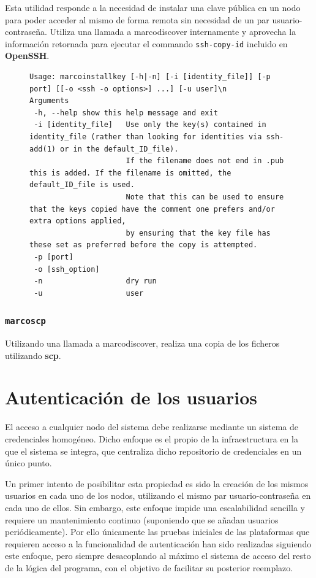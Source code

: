 Esta utilidad responde a la necesidad de instalar una clave pública en un nodo para poder acceder al mismo de forma remota sin necesidad de un par usuario-contraseña. Utiliza una llamada a marcodiscover internamente y aprovecha la información retornada para ejecutar el commando \texttt{ssh-copy-id} incluido en \textbf{OpenSSH}.

\begin{figure}[H]
\begin{lstlisting}
Usage: marcoinstallkey [-h|-n] [-i [identity_file]] [-p port] [[-o <ssh -o options>] ...] [-u user]\n
Arguments
 -h, --help	show this help message and exit
 -i [identity_file]   Use only the key(s) contained in identity_file (rather than looking for identities via ssh-add(1) or in the default_ID_file).
                      If the filename does not end in .pub this is added. If the filename is omitted, the default_ID_file is used.
                      Note that this can be used to ensure that the keys copied have the comment one prefers and/or extra options applied,
                      by ensuring that the key file has these set as preferred before the copy is attempted.
 -p [port]
 -o [ssh_option]
 -n                   dry run
 -u                   user

\end{lstlisting}
\end{figure}

\subsubsection{\texttt{marcoscp}}

Utilizando una llamada a marcodiscover, realiza una copia de los ficheros utilizando \textbf{scp}.


\section{Autenticación de los usuarios}

El acceso a cualquier nodo del sistema debe realizarse mediante un sistema de credenciales homogéneo. Dicho enfoque es el propio de la infraestructura en la que el sistema se integra, que centraliza dicho repositorio de credenciales en un único punto.

Un primer intento de posibilitar esta propiedad es sido la creación de los mismos usuarios en cada uno de los nodos, utilizando el mismo par usuario-contraseña en cada uno de ellos. Sin embargo, este enfoque impide una escalabilidad sencilla y requiere un mantenimiento continuo (suponiendo que se añadan usuarios periódicamente). Por ello únicamente las pruebas iniciales de las plataformas que requieren acceso a la funcionalidad de autenticación han sido realizadas siguiendo este enfoque, pero siempre desacoplando al máximo el sistema de acceso del resto de la lógica del programa, con el objetivo de facilitar su posterior reemplazo.

